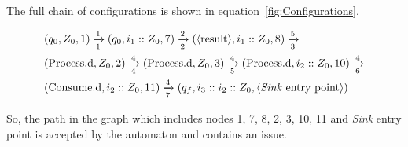 The full chain of configurations is shown in equation~\ref{fig:Configurations}.

\begin{equation}
	\label{fig:Configurations}
	\begin{split}
		& (q_0, Z_0, 1) \xrightarrow[1]{1} (q_0, i_1 :: Z_0, 7) \xrightarrow[2]{2} (\text{\textlangle{}result\textrangle{}}, i_1 :: Z_0, 8) \xrightarrow[3]{5} \\
		& (\text{Process.d}, Z_0, 2) \xrightarrow[4]{4} (\text{Process.d}, Z_0, 3) \xrightarrow[5]{4} (\text{Process.d}, i_2 :: Z_0, 10) \xrightarrow[6]{4} \\
		& (\text{Consume.d}, i_2 :: Z_0, 11) \xrightarrow[7]{4} (q_f, i_3 :: i_2 :: Z_0, \text{\textlangle{}\textit{Sink} entry point\textrangle{}})
	\end{split}
\end{equation}

So, the path in the graph which includes nodes 1, 7, 8, 2, 3, 10, 11 and \textlangle{}\textit{Sink} entry point\textrangle{} is accepted by the automaton and contains an issue.

